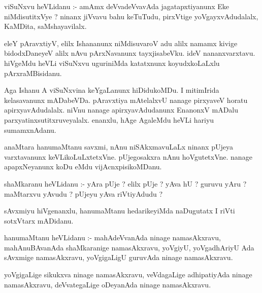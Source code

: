 \documentclass{article}
\begin{document}
\begin{mn}
viSuNxvu  heVLidanu :- amAmx  deVvadeVvavAda  jagatapxtiyanunx  Eke  niMdisutitxVye ?  ninanx  jiVvavu  
bahu  keTuTudu,  pirxVtige  yoVgayxvAdudalalx,  KaMDita,  saMshayavilalx.
\end{mn}

\begin{mn}
eleY  pAravxtiyV,  elilx  Ishananunx  niMdisuvaroV  adu  alilx  namamx  kivige  bidodxDaneyeV  alilx  
nAvu  pArxNavanunx  tayxjisabeVku.  ideV  nananxvarxtavu.  hiVgeMdu  heVLi  viSuNxvu  uguriniMda  
katatxnunx  koyudxkoLaLxlu  pArxraMBisidanu.
\end{mn}

\begin{mn}
Aga  Ishanu  A  viSuNxvina  keYgaLanunx  hiDidukoMDu.  I  mitimIrida  kelasavanunx  mADabeVDa.  pAravxtiya  
mAtelalxvU  nanage  pirxyaveV  horatu  apirxyavAdudalalx.  niVnu  nanage  apirxyavAdudanunx   EnanonxV  
mADalu  parxyatinxsutitxruveyalalx.  enanxlu,  hAge  AgaleMdu  heVLi  hariyu  sumamxnAdanu.
\end{mn}

\begin{mn}
anaMtara  hanumaMtanu  savxmi,  nAnu  niSAkxmavuLaLx  ninanx  pUjeya  varxtavanunx  keVLikoLuLxtetxVne.  
pUjegosakxra  nAnu  hoVgutetxVne.  nanage  apapxNeyanunx  koDu  eMdu  vijAcnxpisikoMDanu.
\end{mn}

\begin{mn}
shaMkaranu  heVLidanu :- yAra  pUje ?  elilx  pUje ?  yAva  hU ?  guruvu  yAru ?  maMtarxvu  
yAvudu ?  pUjeyu  yAva  riVtiyAdudu ?
\end{mn}

\begin{mn}
sAvxmiyu  hiVgenanxlu,  hanumaMtanu  hedarikeyiMda  naDugutatx  I riVti  sotxVtarx  mADidanu.
\end{mn}

\begin{mn}
hanumaMtanu  heVLidanu :- mahAdeVvanAda  ninage  namasAkxravu,  mahAnuBAvanAda  shaMkaranige  namasAkxravu,  
yoVgiyU,  yoVgadhAriyU  Ada  sAvxmige  namasAkxravu,  yoVgigaLigU  guruvAda  ninage  namasAkxravu.
\end{mn}

\begin{mn}
yoVgigaLige  sikukxva  ninage  namasAkxravu,  veVdagaLige  adhipatiyAda  ninage  namasAkxravu,  
deVvategaLige  oDeyanAda  ninage  namasAkxravu.
\end{mn}
\end{document}
